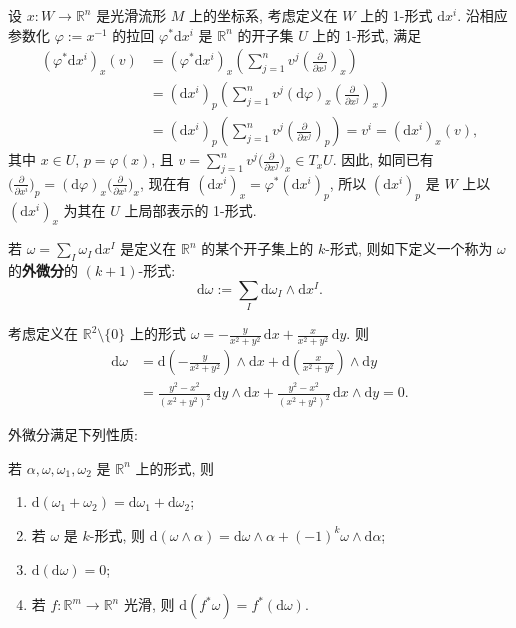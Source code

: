 \begin{RiemannExample}\label{ex:local-representation-of-coordinate-one-form}
设 $x:W\to\mathbb{R}^n$ 是光滑流形 $M$ 上的坐标系, 考虑定义在 $W$ 上的 1-形式 $\mathrm{d}x^i$. 沿相应参数化 $\varphi:=x^{-1}$ 的拉回 $\varphi^*\mathrm{d}x^i$ 是 $\mathbb{R}^n$ 的开子集 $U$ 上的 1-形式, 满足
\begin{align*}
  (\varphi^*\mathrm{d}x^i)_x(v)
  &=(\varphi^*\mathrm{d}x^i)_x\left(\sum_{j=1}^nv^j\left(\frac{\partial}{\partial x^j}\right)_x\right)\\
  &=(\mathrm{d}x^i)_p\left(\sum_{j=1}^nv^j(\mathrm{d}\varphi)_x\left(\frac{\partial}{\partial x^j}\right)_x\right)\\
  &=(\mathrm{d}x^i)_p\left(\sum_{j=1}^nv^j\left(\frac{\partial}{\partial x^j}\right)_p\right)
  =v^i=(\mathrm{d}x^i)_x(v),
\end{align*}
其中 $x\in U$, $p=\varphi(x)$, 且 $v=\sum_{j=1}^nv^j\bigl(\frac{\partial}{\partial x^j}\bigr)_x\in T_xU$. 因此, 如同已有 $\bigl(\frac{\partial}{\partial x^i}\bigr)_p=(\mathrm{d}\varphi)_x\bigl(\frac{\partial}{\partial x^i}\bigr)_x$, 现在有 $(\mathrm{d}x^i)_x=\varphi^*(\mathrm{d}x^i)_p$, 所以 $(\mathrm{d}x^i)_p$ 是 $W$ 上以 $(\mathrm{d}x^i)_x$ 为其在 $U$ 上局部表示的 1-形式.
\end{RiemannExample}

若 $\omega=\sum_I\omega_I\,\mathrm{d}x^I$ 是定义在 $\mathbb{R}^n$ 的某个开子集上的 $k$-形式, 则如下定义一个称为 $\omega$ 的\textbf{外微分}的 $(k+1)$-形式:
\[
  \mathrm{d}\omega:=\sum_I\mathrm{d}\omega_I\wedge\mathrm{d}x^I.
\]

\begin{RiemannExample}\label{ex:exterior-derivative-of-angular-form}
考虑定义在 $\mathbb{R}^2\setminus\{0\}$ 上的形式 $\omega=-\frac{y}{x^2+y^2}\,\mathrm{d}x+\frac{x}{x^2+y^2}\,\mathrm{d}y$. 则
\begin{align*}
  \mathrm{d}\omega
  &=\mathrm{d}\left(-\frac{y}{x^2+y^2}\right)\wedge\mathrm{d}x
    +\mathrm{d}\left(\frac{x}{x^2+y^2}\right)\wedge\mathrm{d}y\\
  &=\frac{y^2-x^2}{(x^2+y^2)^2}\,\mathrm{d}y\wedge\mathrm{d}x
    +\frac{y^2-x^2}{(x^2+y^2)^2}\,\mathrm{d}x\wedge\mathrm{d}y=0.
\end{align*}
\end{RiemannExample}

外微分满足下列性质:

\begin{RiemannProposition}\label{prop:properties-of-exterior-derivative}
若 $\alpha,\omega,\omega_1,\omega_2$ 是 $\mathbb{R}^n$ 上的形式, 则
\begin{enumerate}[label=(\roman*),leftmargin=*]
\item $\mathrm{d}(\omega_1+\omega_2)=\mathrm{d}\omega_1+\mathrm{d}\omega_2$;
\item 若 $\omega$ 是 $k$-形式, 则 $\mathrm{d}(\omega\wedge\alpha)=\mathrm{d}\omega\wedge\alpha+(-1)^k\omega\wedge\mathrm{d}\alpha$;
\item $\mathrm{d}(\mathrm{d}\omega)=0$;
\item 若 $f:\mathbb{R}^m\to\mathbb{R}^n$ 光滑, 则 $\mathrm{d}(f^*\omega)=f^*(\mathrm{d}\omega)$.
\end{enumerate}
\end{RiemannProposition}

